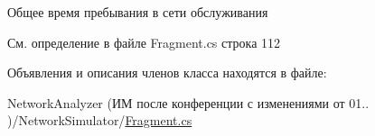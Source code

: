 Общее время пребывания в сети обслуживания 



См. определение в файле Fragment.\+cs строка 112



Объявления и описания членов класса находятся в файле\+:\begin{DoxyCompactItemize}
\item 
Network\+Analyzer (ИМ после конференции  с изменениями от 01.. )/\+Network\+Simulator/\hyperlink{_fragment_8cs}{Fragment.\+cs}\end{DoxyCompactItemize}
